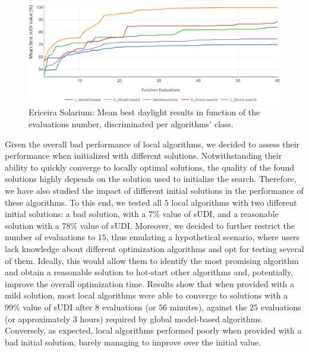 \begin{figure}[]
	\centering
	\includegraphics[width=2\columnwidth]{Images/ericeira/phase_1_v1.PNG}
	\caption{Ericeira Solarium: Mean best daylight results in function of the evaluations number, discriminated per algorithms' class.}
	\label{fig:phase1results}
\end{figure}

Given the overall bad performance of local algorithms, we decided to assess their performance when initialized with different solutions. Notwithstanding their ability to quickly converge to locally optimal solutions, the quality of the found solutions highly depends on the solution used to initialize the search. Therefore, we have also studied the impact of different initial solutions in the performance of these algorithms. To this end, we tested all $5$ local algorithms with two different initial solutions: a bad solution, with a $7\%$ value of \ac{sUDI}, and a reasonable solution with a $78\%$ value of \ac{sUDI}. Moreover, we decided to further restrict the number of evaluations to $15$, thus emulating a hypothetical scenario, where users lack knowledge about different optimization algorithms and opt for testing several of them. Ideally, this would allow them to identify the most promising algorithm and obtain a reasonable solution to hot-start other algorithms and, potentially, improve the overall optimization time. Results show that when provided with a mild solution, most local algorithms were able to converge to solutions with a $99\%$ value of \ac{sUDI} after $8$ evaluations (or $56$ minutes), against the $25$ evaluations (or approximately $3$ hours) required by global model-based algorithms. Conversely, as expected, local algorithms performed poorly when provided with a bad initial solution, barely managing to improve over the initial value.

